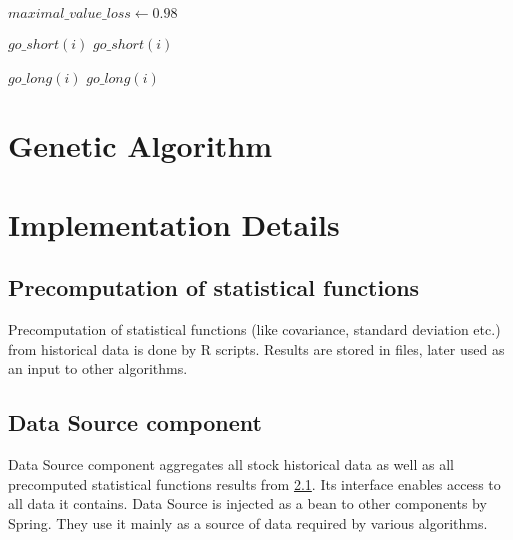 \begin{algorithmic}

\STATE $maximal\_value\_loss \gets 0.98$



	    \STATE $go\_short(i)$
    \ELSE
		    \STATE $go\_short(i)$
	    \ENDIF
    \ENDIF

	    \STATE $go\_long(i)$
    \ELSE
		    \STATE $go\_long(i)$
	    \ENDIF
    \ENDIF

  \ENDFOR

\ENDFOR

\end{algorithmic}



\section{Genetic Algorithm}
\label{sec:genAlgoImpl}




\section{Implementation Details}
\label{sec:implDetails}

\subsection{Precomputation of statistical functions}
\label{precompute}
Precomputation of statistical functions (like covariance, standard deviation etc.) from historical data is done by R scripts. 
Results are stored in files, later used as an input to other algorithms.

\subsection{Data Source component}

Data Source component aggregates all stock historical data as well as all precomputed statistical functions results from \ref{precompute}.   
Its interface enables access to all data it contains. Data Source is injected as a bean to other components by Spring.
They use it mainly as a source of data required by various algorithms.

